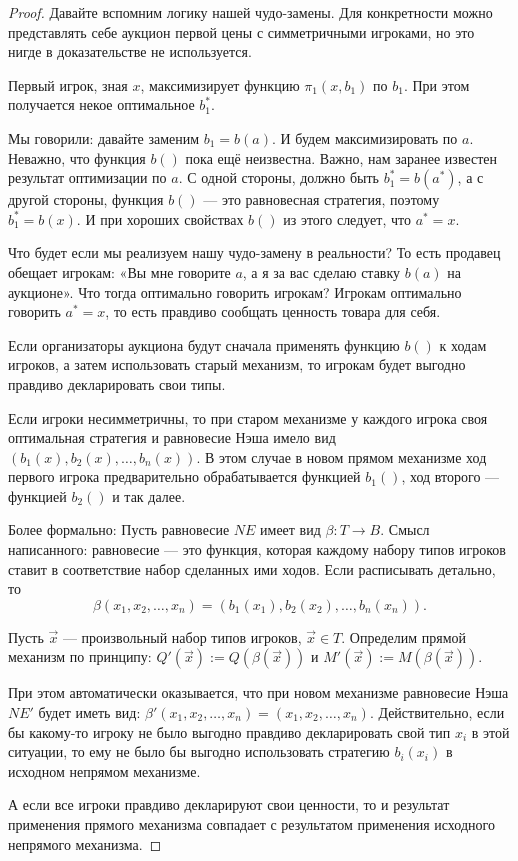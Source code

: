 \begin{proof}
Давайте вспомним логику нашей чудо-замены. Для конкретности можно представлять себе аукцион первой цены с симметричными игроками, но это нигде в доказательстве не используется.

Первый игрок, зная $ x $, максимизирует функцию $ \pi_{1}(x,b_{1}) $ по $ b_{1} $. При этом получается некое оптимальное $ b_{1}^{*} $.

Мы говорили: давайте заменим $ b_{1}=b(a) $. И будем максимизировать по $ a $. Неважно, что функция $ b() $ пока ещё неизвестна. Важно, нам заранее известен результат оптимизации по $ a $. С одной стороны, должно быть $ b_{1}^{*}=b(a^{*})$, а с другой стороны, функция $ b() $ — это равновесная стратегия, поэтому $ b_{1}^{*}=b(x) $. И при хороших свойствах $ b() $ из этого следует, что  $ a^{*}=x $.

Что будет если мы реализуем нашу чудо-замену в реальности? То есть продавец обещает игрокам: «Вы мне говорите $ a $, а я за вас сделаю ставку $ b(a) $ на аукционе». Что тогда оптимально говорить игрокам? Игрокам оптимально говорить $ a^{*}=x $, то есть правдиво сообщать ценность товара для себя.

Если организаторы аукциона будут сначала применять функцию $ b() $ к ходам игроков, а затем использовать старый механизм, то игрокам будет выгодно правдиво декларировать свои типы.



Если игроки несимметричны, то при старом механизме у каждого игрока своя оптимальная стратегия и равновесие Нэша имело вид $ (b_{1}(x),b_{2}(x),\ldots,b_{n}(x)) $. В этом случае в новом прямом механизме ход первого игрока предварительно обрабатывается функцией $ b_{1}() $, ход второго — функцией $ b_{2}() $ и так далее.

Более формально: Пусть равновесие $ NE $ имеет вид $ \beta: T\to B $. Смысл написанного: равновесие — это функция, которая каждому набору типов игроков ставит в соответствие набор сделанных ими ходов. Если расписывать детально, то
\[
\beta(x_{1},x_{2},\ldots,x_{n})=(b_{1}(x_{1}),b_{2}(x_{2}),\ldots,b_{n}(x_{n})).
\]

Пусть $ \vec{x} $ — произвольный набор типов игроков, $ \vec{x}\in T $. Определим прямой механизм по принципу: $ Q'(\vec{x}):=Q(\beta(\vec{x})) $ и
$ M'(\vec{x}):=M(\beta(\vec{x}))  $.

При этом автоматически оказывается, что при новом механизме равновесие Нэша $ NE' $ будет иметь вид: $ \beta'(x_{1},x_{2},\ldots,x_{n})=(x_{1},x_{2},\ldots,x_{n}) $. Действительно, если бы какому-то игроку  не было выгодно правдиво декларировать свой тип $ x_{i} $ в этой ситуации, то ему не было бы выгодно использовать стратегию $ b_{i}(x_{i}) $ в исходном непрямом механизме.

А если все игроки правдиво декларируют свои ценности, то и результат применения прямого механизма совпадает с результатом применения исходного непрямого механизма.
\end{proof}

